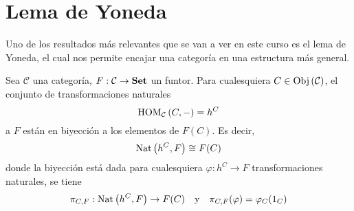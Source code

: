 \documentclass[12pt]{report}
\newcounter{it}
\theoremstyle{largebreak}
\newcommand\cf[3]{\ensuremath{#1:#2\rightarrow#3}}
\newcommand{\Obj}[1]{\ensuremath{\textup{Obj}\left(#1\right)}}
\newcommand{\Cat}[1]{\ensuremath{\textup{\textbf{#1}}}}
\begin{document}
    \section{Lema de Yoneda}

    Uno de los resultados más relevantes que se van a ver en este curso es el lema de Yoneda, el cual nos permite encajar una categoría en una estructura más general.
    
    \begin{theor}
        Sea $\mathcal{C}$ una categoría, $\cf{F}{\mathcal{C}}{\Cat{Set}}$ un funtor. Para cualesquiera $C\in\Obj{\mathcal{C}}$, el conjunto de transformaciones naturales
        \begin{equation*}
            \textup{HOM}_{\mathcal{C}}\left(C,-\right)=h^C
        \end{equation*}
        a $F$ están en biyección a los elementos de $F(C)$. Es decir,
        \begin{equation*}
            \textup{Nat}\left(h^C,F\right)\cong F(C)
        \end{equation*}
        donde la biyección está dada para cualesquiera $\cf{\varphi}{h^C}{F}$ transformaciones naturales, se tiene
        \begin{equation*}
            \cf{\pi_{ C,F}}{\Nat{h^C}{F}}{F(C)}\quad\textup{y}\quad \pi_{ C,F}(\varphi)=\varphi_C(1_C)
        \end{equation*}
    \end{theor}
\end{document}
